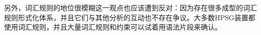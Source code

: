 
另外，词汇规则的地位很模糊这一观点也应该遭到反对：因为存在很多成型的词汇规则形式化体系\citep{Meurers2001a,CB92a,LC99a}，并且它们与其他分析的互动也不存在争议。大多数HPSG装置都使用词汇规则，并且大量词汇规则和约束可以试着用语法片段来确认。

